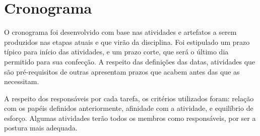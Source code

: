 \chapter[Cronograma]{Cronograma}

O cronograma foi desenvolvido com base nas atividades e artefatos a serem produzidos nas etapas atuais e que virão da disciplina. Foi estipulado um prazo típico para início das atividades, e um prazo corte, que será o último dia permitido para sua confecção. A respeito das definições das datas, atividades que são pré-requisitos de outras apresentam prazos que acabem antes das que as necessitam.

A respeito dos responsáveis por cada tarefa, os critérios utilizados foram: relação com os papéis definidos anteriormente, afinidade com a atividade, e equilíbrio de esforço. Algumas atividades terão todos os membros como responsáveis, por ser a postura mais adequada.

